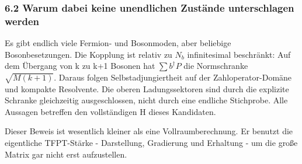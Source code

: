 \subsubsection{6.2 Warum dabei keine unendlichen Zustände unterschlagen
werden}\label{warum-dabei-keine-unendlichen-zustuxe4nde-unterschlagen-werden}

Es gibt endlich viele Fermion- und Bosonmoden, aber beliebige
Bosonbesetzungen. Die Kopplung ist relativ zu \(N_b\) infinitesimal
beschränkt: Auf dem Übergang von k zu k+1 Bosonen hat
\(\sum b^\dagger P\) die Normschranke \(\sqrt{M(k+1)}\). Daraus folgen
Selbstadjungiertheit auf der Zahloperator-Domäne und kompakte
Resolvente. Die oberen Ladungssektoren sind durch die explizite Schranke
gleichzeitig ausgeschlossen, nicht durch eine endliche Stichprobe. Alle
Aussagen betreffen den vollständigen H dieses Kandidaten.

Dieser Beweis ist wesentlich kleiner als eine Vollraumberechnung. Er
benutzt die eigentliche TFPT-Stärke - Darstellung, Gradierung und
Erhaltung - um die große Matrix gar nicht erst aufzustellen.

